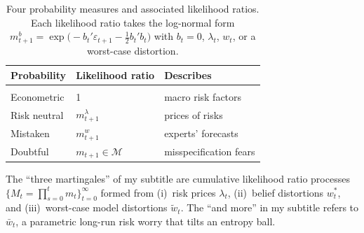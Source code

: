 \documentclass[12pt]{article}
\theoremstyle{definition}
\begin{document}
\begin{table}[H]
\begin{center}
\begin{tabular}{lll}
\textbf{Probability}  & \textbf{Likelihood ratio} & \textbf{Describes} \\
\hline\\[-6pt]
Econometric  &  1 &  macro risk factors \\[4pt]
Risk neutral  & $m_{t+1}^\lambda $ & prices of risks  \\[4pt]
Mistaken &  $m_{t+1}^w $  & experts' forecasts  \\[4pt]
Doubtful & $m_{t+1} \in {\mathcal M} $ & misspecification fears  \\[4pt]
\end{tabular}
\end{center}
\caption{Four probability measures and associated likelihood ratios.
Each likelihood ratio takes the log-normal form
$m_{t+1}^b = \exp\bigl(-b_t' \varepsilon_{t+1} - \tfrac{1}{2} b_t' b_t \bigr)$
with $b_t = 0$, $\lambda_t$, $w_t$, or a worst-case distortion.}
\label{tab:four-measures}
\end{table}

The ``three martingales'' of my subtitle are cumulative likelihood
ratio processes $\{M_t = \prod_{s=0}^t m_t \}_{t=0}^\infty$ formed from (i)~risk prices $\lambda_t$,
(ii)~belief distortions $w_t^*$, and (iii)~worst-case model distortions
$\tilde w_t$.  The ``and more'' in my subtitle refers to $\bar w_t$, a parametric
long-run risk worry that tilts an entropy ball.
\end{document}

